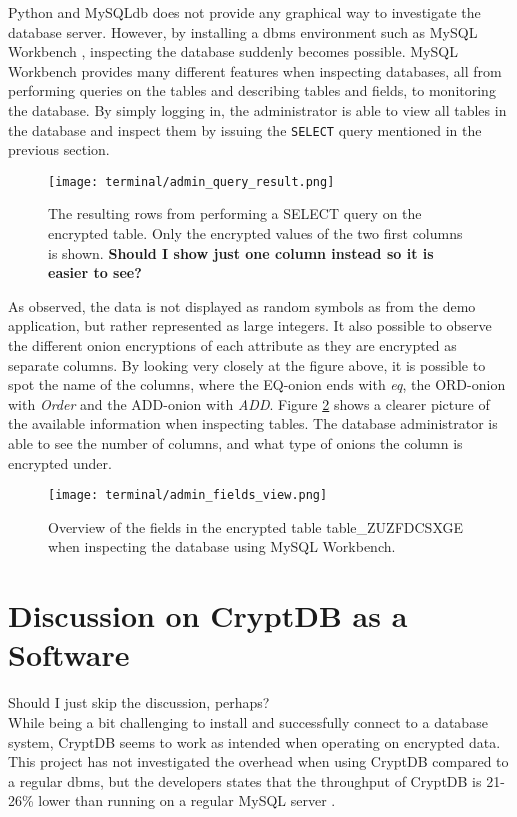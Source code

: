 Python and MySQLdb does not provide any graphical way to investigate the database server. However, by installing a \gls{dbms} environment such as MySQL Workbench \cite{mysql_workbench}, inspecting the database suddenly becomes possible. MySQL Workbench provides many different features when inspecting databases, all from performing queries on the tables and describing tables and fields, to 
monitoring the database. By simply logging in, the administrator is able to view all tables in the database and inspect them by issuing the \verb!SELECT! query mentioned in the previous section.

\begin{figure}[h]
	\centering
	\texttt{[image: terminal/admin\_query\_result.png]}
	\caption{The resulting rows from performing a SELECT query on the encrypted table. Only the encrypted values of the two first columns is shown. \textbf{Should I show just one column instead so it is easier to see?}}
	\label{fig:admin_query_result}
\end{figure}

As observed, the data is not displayed as random symbols as from the demo application, but rather represented as large integers. It also possible to observe the different onion encryptions of each attribute as they are encrypted as separate columns. By looking very closely at the figure above, it is possible to spot the name of the columns, where the EQ-onion ends with \emph{eq}, the ORD-onion with \emph{Order} and the ADD-onion with \emph{ADD}. Figure \ref{fig:admin_fields_view} shows a clearer picture of the available information when inspecting tables. The database administrator is able to see the number of columns, and what type of onions the column is encrypted under.

\begin{figure}[h]
	\centering
	\texttt{[image: terminal/admin\_fields\_view.png]}
	\caption{Overview of the fields in the encrypted table table\_ZUZFDCSXGE when inspecting the database using MySQL Workbench.}
	\label{fig:admin_fields_view}
\end{figure}

\section{Discussion on CryptDB as a Software}

Should I just skip the discussion, perhaps? \\

While being a bit challenging to install and successfully connect to a database system, CryptDB seems to work as intended when operating on encrypted data. This project has not investigated the overhead when using CryptDB compared to a regular \gls{dbms}, but the developers states that the throughput of CryptDB is 21-26\% lower than running on a regular MySQL server \citep{CryptDB_Main_Paper}. 

